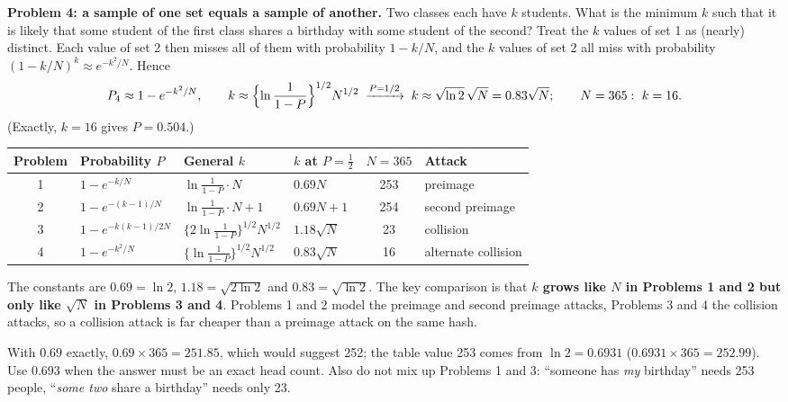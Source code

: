 \textbf{Problem 4: a sample of one set equals a sample of another.} Two classes each have $k$ students. What is the minimum $k$ such that it is likely that some student of the first class shares a birthday with some student of the second? Treat the $k$ values of set 1 as (nearly) distinct. Each value of set 2 then misses all of them with probability $1 - k/N$, and the $k$ values of set 2 all miss with probability $(1 - k/N)^k \approx e^{-k^2/N}$. Hence
\[
P_4 \approx 1 - e^{-k^2/N}, \qquad k \approx \Bigl\{\ln\frac{1}{1-P}\Bigr\}^{1/2} N^{1/2} \;\xrightarrow{P = 1/2}\; k \approx \sqrt{\ln 2}\,\sqrt N = 0.83\sqrt N ;\qquad N = 365:\ k = 16 .
\]
(Exactly, $k = 16$ gives $P = 0.504$.)

\begin{center}\small
\begin{tabular}{@{}clllcl@{}}
\toprule
Problem & Probability $P$ & General $k$ & $k$ at $P = \tfrac12$ & $N = 365$ & Attack\\
\midrule
1 & $1 - e^{-k/N}$ & $\ln\frac{1}{1-P} \cdot N$ & $0.69N$ & 253 & preimage\\
2 & $1 - e^{-(k-1)/N}$ & $\ln\frac{1}{1-P} \cdot N + 1$ & $0.69N + 1$ & 254 & second preimage\\
3 & $1 - e^{-k(k-1)/2N}$ & $\{2\ln\frac{1}{1-P}\}^{1/2} N^{1/2}$ & $1.18\sqrt N$ & 23 & collision\\
4 & $1 - e^{-k^2/N}$ & $\{\ln\frac{1}{1-P}\}^{1/2} N^{1/2}$ & $0.83\sqrt N$ & 16 & alternate collision\\
\bottomrule
\end{tabular}
\end{center}
The constants are $0.69 = \ln 2$, $1.18 = \sqrt{2\ln 2}$ and $0.83 = \sqrt{\ln 2}$. The key comparison is that \textbf{$k$ grows like $N$ in Problems 1 and 2 but only like $\sqrt N$ in Problems 3 and 4}. Problems 1 and 2 model the preimage and second preimage attacks, Problems 3 and 4 the collision attacks, so a collision attack is far cheaper than a preimage attack on the same hash.

\begin{trap}
With $0.69$ exactly, $0.69 \times 365 = 251.85$, which would suggest 252; the table value 253 comes from $\ln 2 = 0.6931$ ($0.6931 \times 365 = 252.99$). Use $0.693$ when the answer must be an exact head count. Also do not mix up Problems 1 and 3: ``someone has \emph{my} birthday'' needs 253 people, ``\emph{some two} share a birthday'' needs only 23.
\end{trap}

